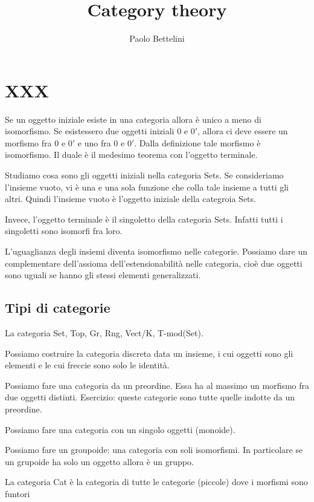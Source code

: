 \documentclass[a4paper]{article}
\title{Category theory}
\author{Paolo Bettelini}
\date{}
\begin{document}
\maketitle
\tableofcontents

\section{XXX}

Se un oggetto iniziale esiste in una categoria allora è unico a meno di isomorfismo.
Se esistessero due oggetti iniziali \(0\) e \(0'\), allora ci deve essere
un morfismo fra \(0\) e \(0'\) e uno fra \(0\) e \(0'\).
Dalla definizione tale morfismo è isomorfismo.
Il duale è il medesimo teorema con l'oggetto terminale.

Studiamo cosa sono gli oggetti iniziali nella categoria Sets.
Se consideriamo l'insieme vuoto, vi è una e una sola funzione che colla tale insieme
a tutti gli altri. Quindi l'insieme vuoto è l'oggetto iniziale della categroia Sets.

Invece, l'oggetto terminale è il singoletto della categoria Sets.
Infatti tutti i singoletti sono isomorfi fra loro.

L'uguaglianza degli insiemi diventa isomorfismo nelle categorie.
Possiamo dare un complementare dell'assioma dell'estensionabilità
nelle categoria, cioè due oggetti sono uguali se hanno gli stessi elementi generalizzati.

\subsection{Tipi di categorie}

La categoria Set, Top, Gr, Rng, Vect/K, T-mod(Set).

Possiamo costruire la categoria discreta data un insieme, i cui oggetti sono gli elementi
e le cui freccie sono solo le identità.

Possiamo fare una categoria da un preordine.
Essa ha al massimo un morfismo fra due oggetti distinti.
Esercizio: queste categorie sono tutte quelle indotte da un preordine.

Possiamo fare una categoria con un singolo oggetti (monoide).

Possiamo fare un groupoide: una categoria con soli isomorfismi.
In particolare se un grupoide ha solo un oggetto allora è un gruppo.

La categoria Cat è la categoria di tutte le categorie (piccole)
dove i morfismi sono funtori
\end{document}
